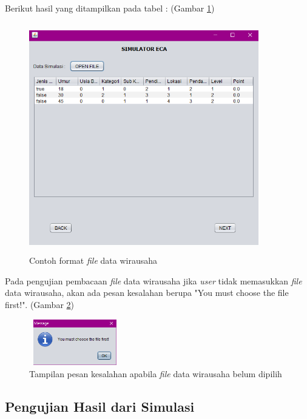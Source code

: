 Berikut hasil yang ditampilkan pada tabel : (Gambar \ref{tampilanData})

	\begin{figure} [H]
	\centering  
	\includegraphics[width=10cm, height=10cm]{tampilanData} 
		\caption[Contoh format \textit{file} data wirausaha]{Contoh format \textit{file} data wirausaha}
	\label{tampilanData} 
\end{figure}

Pada pengujian pembacaan \textit{file} data wirausaha jika \textit{user} tidak memasukkan \textit{file} data wirausaha, akan ada pesan kesalahan berupa "You must choose the file first!". (Gambar \ref{pesanError6})

	\begin{figure} [H]
	\centering  
	\includegraphics[width=4cm, height=2cm]{pesanError6} 
		\caption[Tampilan pesan kesalahan apabila \textit{file} data wirausaha belum dipilih]{Tampilan pesan kesalahan apabila \textit{file} data wirausaha belum dipilih}
	\label{pesanError6} 
\end{figure}

 
\subsection{Pengujian Hasil dari Simulasi}

